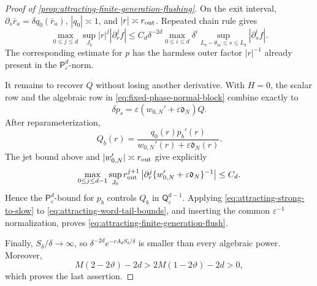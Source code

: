 \begin{proof}[Proof of
\cref{prop:attracting-finite-generation-flushing}]
On the exit interval, \(\partial_s\bar r_a=\delta q_0(\bar r_a)\),
\(|q_0|\asymp1\), and \(|r|\asymp r_{\rm out}\).  Repeated chain rule gives
\begin{equation}
 \max_{0\le j\le d}\sup_{J_b}|r|^j|\partial_r^jf|
 \le C_d\delta^{-2d}
   \max_{0\le i\le d}\delta^i
       \sup_{L_b-\theta_m\le s\le L_b}|\partial_s^if|.         \label{eq:attracting-strong-to-slow}
\end{equation}
The corresponding estimate for \(p\) has the harmless outer factor
\(|r|^{-1}\) already present in the
\(\mathsf P_\varepsilon^d\)-norm.

It remains to recover \(Q\) without losing another derivative.  With
\(H=0\), the scalar row and the algebraic row in
\cref{eq:fixed-phase-normal-block} combine exactly to
\[
 \delta p_s=\varepsilon
       (w_{0,N}'+\varepsilon\mathfrak d_N)Q.
\]
After reparameterization,
\begin{equation}
 Q_b(r)=\frac{q_0(r)p_b'(r)}
              {w_{0,N}'(r)+\varepsilon\mathfrak d_N(r)}.       \label{eq:attracting-Q-from-p}
\end{equation}
The jet bound above and \(|w_{0,N}'|\asymp r_{\rm out}\) give explicitly
\begin{equation*}
 \max_{0\le j\le d-1}
 \sup_{J_b}r_{\rm out}^{j+1}
 \left|\partial_r^j
   \{w_{0,N}'+\varepsilon\mathfrak d_N\}^{-1}\right|\le C_d.
\end{equation*}
Hence the
\(\mathsf P_\varepsilon^d\)-bound for \(p_b\) controls
\(Q_b\) in \(\mathsf Q_\varepsilon^{d-1}\).
Applying \cref{eq:attracting-strong-to-slow} to
\cref{eq:attracting-word-tail-bounds}, and inserting the common
\(\varepsilon^{-1}\) normalization, proves
\cref{eq:attracting-finite-generation-flush}.

Finally, \(S_\delta/\delta\to\infty\), so
\(\delta^{-2d}e^{-cA_dS_\delta/\delta}\) is smaller than every algebraic
power.  Moreover,
\[
 M(2-2\vartheta)-2d
 >2M(1-2\vartheta)-2d>0,
\]
which proves the last assertion.
\end{proof}

